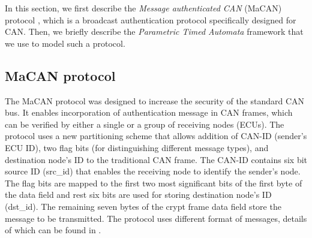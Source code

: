 
In this section, we first describe the \textit{Message authenticated CAN} (MaCAN) protocol \cite{KO15}, which is a broadcast authentication protocol specifically designed for CAN. Then, we briefly describe the \textit{Parametric Timed Automata} framework that we use to model such a protocol.    

\subsection{MaCAN protocol}
The MaCAN protocol was designed to increase the security of the standard CAN bus. It enables incorporation of authentication message in CAN frames, which can be verified by either a single or a group of receiving nodes (ECUs). The protocol uses a new partitioning scheme that allows addition of CAN-ID (sender's ECU ID), two flag bits (for distinguishing different message types), and destination node's ID to the traditional CAN frame. The CAN-ID contains six bit source ID (src\_id) that enables the receiving node to identify the sender's node. The flag bits are mapped to the first two most significant bits of the first byte of the data field and rest six bits are used for storing destination node's ID (dst\_id). The remaining seven bytes of the crypt frame data field store the message to be transmitted. The protocol uses different format of messages, details of which can be found in \cite{KO15}.     
\vspace*{-0.15in}
